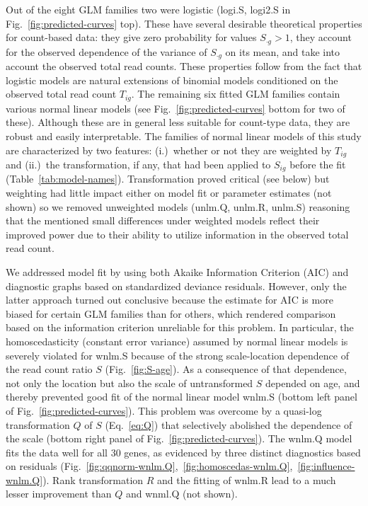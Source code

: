 \documentclass[12pt,letterpaper]{article}
\begin{document}
Out of the eight GLM families two were logistic (logi.S, logi2.S in
Fig.~\ref{fig:predicted-curves} top).  These have several desirable
theoretical properties for count-based data: they give zero probability for
values \(S_{\cdot g}>1\), they account for the observed dependence of the
variance of \(S_{\cdot g}\) on its mean, and take into account the observed
total read counts.  These properties follow from the fact that logistic models
are natural extensions of binomial models conditioned on the observed total
read count \(T_{ig}\).  The remaining six fitted GLM families contain various
normal linear models (see Fig.~\ref{fig:predicted-curves} bottom for two of
these).  Although these are in general less suitable for count-type data, they
are robust and easily interpretable. The families of normal linear models of
this study are characterized by two features: (i.)~whether or not they are
weighted by \(T_{ig}\) and (ii.)~the transformation, if any, that had been
applied to \(S_{ig}\) before the fit (Table~\ref{tab:model-names}).
Transformation proved critical (see below) but weighting had little impact
either on model fit or parameter estimates (not shown) so we removed
unweighted models (unlm.Q, unlm.R, unlm.S) reasoning that the mentioned small
differences under weighted models reflect their improved power due to their
ability to utilize information in the observed total read count.

We addressed model fit by using both Akaike Information Criterion (AIC) and
diagnostic graphs based on standardized deviance residuals.  However, only the
latter approach turned out conclusive because the estimate for AIC is more
biased for certain GLM families than for others, which rendered comparison
based on the information criterion unreliable for this problem.  In
particular, the homoscedasticity (constant error variance) assumed by normal
linear models is severely violated for wnlm.S because of the strong
scale-location dependence of the read count ratio \(S\)
(Fig.~\ref{fig:S-age}).  As a consequence of that dependence, not only
the location but also the scale of untransformed \(S\) depended on age, and
thereby prevented good fit of the normal linear model wnlm.S (bottom left
panel of Fig.~\ref{fig:predicted-curves}).  This problem was overcome by a
quasi-log transformation \(Q\) of \(S\) (Eq.~\ref{eq:Q}) that selectively
abolished the dependence of the scale (bottom right panel of
Fig.~\ref{fig:predicted-curves}).  The wnlm.Q model fits the data well for all
30 genes, as evidenced by three distinct diagnostics based on residuals
(Fig.~\ref{fig:qqnorm-wnlm.Q},~\ref{fig:homoscedas-wnlm.Q},~\ref{fig:influence-wnlm.Q}).
Rank transformation \(R\) and the fitting of wnlm.R lead to a much lesser
improvement than \(Q\) and wnml.Q (not shown).
\end{document}
